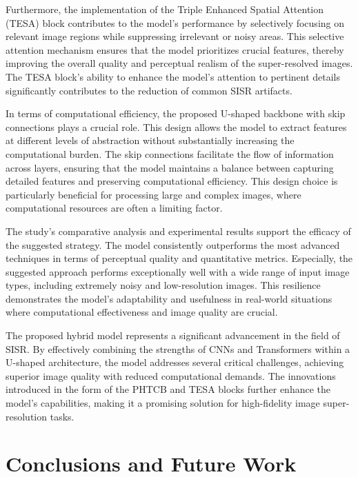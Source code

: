 \documentclass{ieeeaccess}
\begin{document}
Furthermore, the implementation of the Triple Enhanced Spatial Attention (TESA) block contributes to the model's performance by selectively focusing on relevant image regions while suppressing irrelevant or noisy areas. This selective attention mechanism ensures that the model prioritizes crucial features, thereby improving the overall quality and perceptual realism of the super-resolved images. The TESA block's ability to enhance the model's attention to pertinent details significantly contributes to the reduction of common SISR artifacts.

In terms of computational efficiency, the proposed U-shaped backbone with skip connections plays a crucial role. This design allows the model to extract features at different levels of abstraction without substantially increasing the computational burden. The skip connections facilitate the flow of information across layers, ensuring that the model maintains a balance between capturing detailed features and preserving computational efficiency. This design choice is particularly beneficial for processing large and complex images, where computational resources are often a limiting factor.

The study's comparative analysis and experimental results support the efficacy of the suggested strategy. The model consistently outperforms the most advanced techniques in terms of perceptual quality and quantitative metrics. Especially, the suggested approach performs exceptionally well with a wide range of input image types, including extremely noisy and low-resolution images. This resilience demonstrates the model's adaptability and usefulness in real-world situations where computational effectiveness and image quality are crucial.

The proposed hybrid model represents a significant advancement in the field of SISR. By effectively combining the strengths of CNNs and Transformers within a U-shaped architecture, the model addresses several critical challenges, achieving superior image quality with reduced computational demands. The innovations introduced in the form of the PHTCB and TESA blocks further enhance the model's capabilities, making it a promising solution for high-fidelity image super-resolution tasks.


\section{Conclusions and Future Work}
\end{document}
